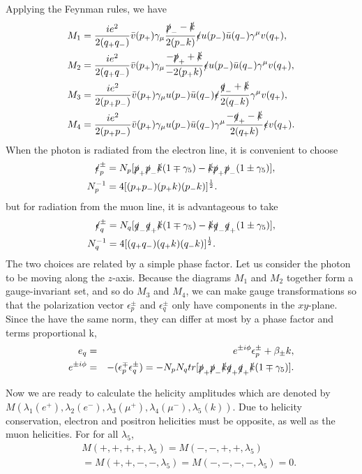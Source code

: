 Applying the Feynman rules, we have
\begin{align}
M_1&=\frac{ie^2}{2(q_+q_-)}\bar{v}(p_+)\gamma_\mu\frac{\slashed p_--\slashed k}{2(p_-k)}\slashed\epsilon u(p_-)\bar{u}(q_-)\gamma^\mu v(q_+),\nonumber\\
M_2&=\frac{ie^2}{2(q_+q_-)}\bar{v}(p_+)\gamma_\mu\frac{-\slashed p_++\slashed k}{-2(p_+k)}\slashed\epsilon u(p_-)\bar{u}(q_-)\gamma^\mu v(q_+),\nonumber\\
M_3&=\frac{ie^2}{2(p_+p_-)}\bar{v}(p_+)\gamma_\mu u(p_-)\bar{u}(q_-)\slashed\epsilon\frac{\slashed q_-+\slashed k}{2(q_-k)}\gamma^\mu v(q_+),\nonumber\\
M_4&=\frac{ie^2}{2(p_+p_-)}\bar{v}(p_+)\gamma_\mu u(p_-)\bar{u}(q_-)\gamma^\mu\frac{-\slashed q_+-\slashed k}{2(q_+k)}\slashed\epsilon v(q_+).
\end{align}
When the photon is radiated from the electron line, it is convenient to choose
\begin{align}
\slashed\epsilon^\pm_p&=N_p[\slashed p_+\slashed p_-\slashed k(1\mp\gamma_5)-\slashed k\slashed p_+\slashed p_-(1\pm\gamma_5)],\nonumber\\
N^{-1}_p&=4[(p_+p_-)(p_+k)(p_-k)]^\frac{1}{2}.
\end{align}
but for radiation from the muon line, it is advantageous to take
\begin{align}
\slashed\epsilon^\pm_q&=N_q[\slashed q_-\slashed q_+\slashed k(1\mp\gamma_5)-\slashed k\slashed q_-\slashed q_+(1\pm\gamma_5)],\nonumber\\
N^{-1}_q&=4[(q_+q_-)(q_+k)(q_-k)]^\frac{1}{2}.
\end{align}
The two choices are related by a simple phase factor. Let us consider the photon to be moving along the $z$-axis. Because the diagrams $M_1$ and $M_2$ together form a gauge-invariant set, and so do $M_3$ and $M_4$, we can make gauge transformations so that the polarization vector $\epsilon^\pm_p$ and $\epsilon^\pm_q$ only have components in the $xy$-plane. Since the have the same norm, they can differ at most by a phase factor and terms proportional k,
\begin{eqnarray}
e_q&=&e^{\pm i\phi}\epsilon^\pm_p+\beta_\pm k,\nonumber\\
e^{\pm i\phi}&=&-(\epsilon^\mp_p\epsilon^\pm_q)=-N_pN_qtr[\slashed p_+\slashed p_-\slashed k\slashed q_+\slashed q_+\slashed k(1\mp\gamma_5)].
\end{eqnarray}

Now we are ready to calculate the helicity amplitudes which are denoted by $M(\lambda_1(e^+),\lambda_2(e^-),\lambda_3(\mu^+),\lambda_4(\mu^-),\lambda_5(k))$. Due to helicity conservation, electron and positron helicities must be opposite, as well as the muon helicities. For for all $\lambda_5$,
\begin{eqnarray}
&&M(+,+,+,+,\lambda_5)=M(-,-,+,+,\lambda_5)\nonumber\\
&&=M(+,+,-,-,\lambda_5)=M(-,-,-,-,\lambda_5)=0.
\end{eqnarray}

